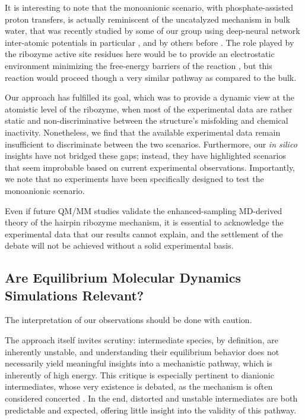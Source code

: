 \documentclass[journal=jacsat,manuscript=article]{achemso}
\begin{document}
It is interesting to note that the monoanionic scenario, 
with phosphate-assisted proton transfers, 
is actually reminiscent of the uncatalyzed mechanism in bulk water, 
that was recently studied by some of our group using deep-neural network inter-atomic potentials in particular \cite{benayad_molecular_2022,benayad_molecular_2023}, 
and by others before \cite{florian_phosphate_1998,duarte_resolving_2015}. 
The role played by the ribozyme active site residues here would be to 
provide an electrostatic environment minimizing the free-energy barriers of the reaction \cite{warshel_electrostatic_2006}, 
but this reaction would proceed though a very similar pathway as compared to the bulk.

Our approach has fulfilled its goal, which was to provide a dynamic view at the atomistic level of the ribozyme,
when most of the experimental data are rather static and non-discriminative 
between the structure's misfolding and chemical inactivity.
Nonetheless, we find that the available experimental data remain insufficient to discriminate between the two scenarios.
Furthermore, our \textit{in silico} insights have not bridged these gaps;
instead, they have highlighted scenarios that seem improbable based on current experimental observations.
Importantly, we note that no experiments have been specifically designed to test the monoanionic scenario.

Even if future QM/MM studies validate the enhanced-sampling MD-derived theory of the hairpin ribozyme mechanism,
it is essential to acknowledge the experimental data that our results cannot explain, 
and the settlement of the debate will not be achieved without a solid experimental basis.

\subsection{Are Equilibrium Molecular Dynamics Simulations Relevant?}

The interpretation of our observations should be done with caution.

The approach itself invites scrutiny: intermediate species, by definition, are inherently unstable,
and understanding their equilibrium behavior does not necessarily yield meaningful insights into a mechanistic pathway,
which is inherently of high energy.
This critique is especially pertinent to dianionic intermediates,
whose very existence is debated, as the mechanism is often considered concerted \cite{mlynsky_comparison_2014,mlynsky_qmmm_2011,nam_electrostatic_2008}.
In the end, distorted and unstable intermediates are both predictable and expected,
offering little insight into the validity of this pathway.
\end{document}

